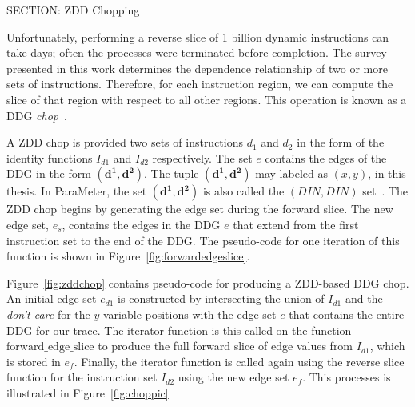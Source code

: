 {%


SECTION: ZDD Chopping


Unfortunately, performing a reverse slice of 1 billion dynamic instructions can take days; often the processes were terminated before completion. The survey presented in this work determines the dependence relationship of two or more sets of instructions. Therefore, for each instruction region, we can compute the slice of that region with respect to all other regions.  This operation is known as a DDG \textit{chop}~\cite{gupta:2005:ase, krinke:2004:sqc}.

A ZDD chop is provided two sets of instructions $d_{1}$ and $d_{2}$ in the form of the identity functions $I_{d1}$ and $I_{d2}$ respectively. The set $e$ contains the edges of the DDG in the form $(\mathbf{d^1},\mathbf{d^2})$. The tuple $(\mathbf{d^1},\mathbf{d^2})$ may labeled as $(x,y)$, in this thesis.  In ParaMeter, the set $(\mathbf{d^1},\mathbf{d^2})$ is also called the $(DIN,DIN)$ set~\cite{price:08:pact}. The ZDD chop begins by generating the edge set during the forward slice.  The new edge set, $e_s$, contains the edges in the DDG $e$ that extend from the first instruction set to the end of the DDG.  The pseudo-code for one iteration of this function is shown in Figure~\ref{fig:forwardedgeslice}.

Figure~\ref{fig:zddchop} contains pseudo-code for producing a ZDD-based DDG chop.  An initial edge set $e_{d1}$ is constructed by intersecting the union of $I_{d1}$ and the \textit{don't care} for the $y$ variable positions with the edge set $e$ that contains the entire DDG for our trace.  The iterator function is this called on the function $\mathrm{forward\_edge\_slice}$ to produce the full forward slice of edge values from $I_{d1}$, which is stored in $e_f$. Finally, the iterator function is called again using the reverse slice function for the instruction set $I_{d2}$ using the new edge set $e_f$.  This processes is illustrated in Figure~\ref{fig:choppic}

}
